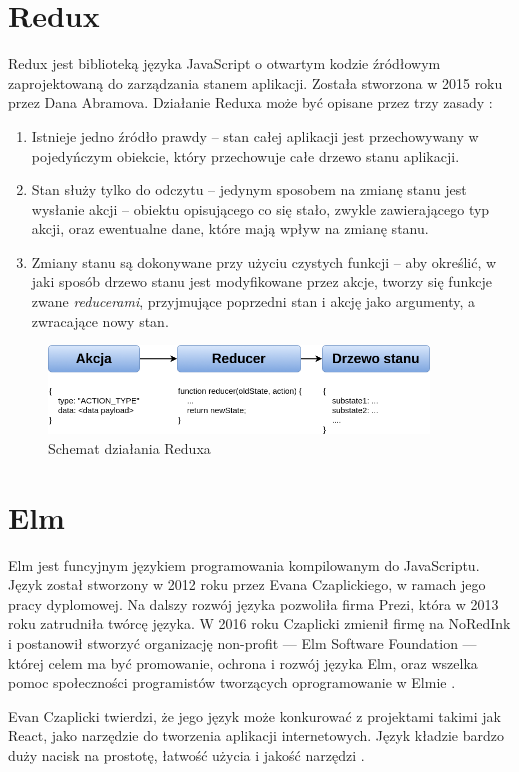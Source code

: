 \section{Redux}
Redux jest biblioteką języka JavaScript o otwartym kodzie źródłowym zaprojektowaną do zarządzania stanem aplikacji. Została stworzona w 2015 roku przez Dana Abramova. Działanie Reduxa może być opisane przez trzy zasady \cite{reduxDocs}:
\begin{enumerate}
	\item Istnieje jedno źródło prawdy -- stan całej aplikacji jest przechowywany w pojedyńczym obiekcie, który przechowuje całe drzewo stanu aplikacji.
	\item Stan służy tylko do odczytu -- jedynym sposobem na zmianę stanu jest wysłanie akcji -- obiektu opisującego co się stało, zwykle zawierającego typ akcji, oraz ewentualne dane, które mają wpływ na zmianę stanu.
	\item Zmiany stanu są dokonywane przy użyciu czystych funkcji -- aby określić, w jaki sposób drzewo stanu jest modyfikowane przez akcje, tworzy się funkcje zwane \textit{reducerami}, przyjmujące poprzedni stan i akcję jako argumenty, a zwracające nowy stan.
\end{enumerate}
\begin{figure}[h]
	\centering
	\includegraphics[width=0.9\textwidth]{images/redux_flow}
	\caption{Schemat działania Reduxa}
\end{figure}

\section{Elm}
Elm jest funcyjnym językiem programowania kompilowanym do JavaScriptu. Język został stworzony w 2012 roku przez Evana Czaplickiego, w ramach jego pracy dyplomowej. Na dalszy rozwój języka pozwoliła firma Prezi, która w 2013 roku zatrudniła twórcę języka. W 2016 roku Czaplicki zmienił firmę na NoRedInk i postanowił stworzyć organizację non-profit --- Elm Software Foundation --- której celem ma być promowanie, ochrona i rozwój języka Elm, oraz wszelka pomoc społeczności programistów tworzących oprogramowanie w Elmie \cite{newAdventures}.

Evan Czaplicki twierdzi, że jego język może konkurować z projektami takimi jak React, jako narzędzie do tworzenia aplikacji internetowych. Język kładzie bardzo duży nacisk na prostotę, łatwość użycia i jakość narzędzi \cite{elmGuide}.